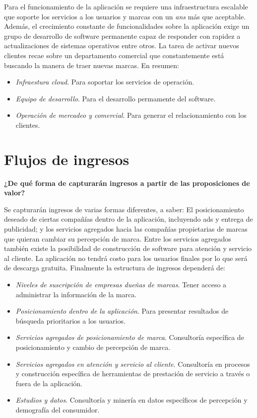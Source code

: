 Para el funcionamiento de la aplicación se requiere una infraestructura escalable que soporte los servicios a los usuarios y marcas con un \textit{ans} más que aceptable. Además, el crecimiento constante de funcionalidades sobre la aplicación exige un grupo de desarrollo de software permanente capaz de responder con rapidez a actualizaciones de sistemas operativos entre otros. La tarea de activar nuevos clientes recae sobre un departamento comercial que constantemente está buscando la manera de traer nuevas marcas. En resumen:

\begin{itemize}
    \item \textit{Infraestura cloud}. Para soportar los servicios de operación. 
    \item \textit{Equipo de desarrollo}. Para el desarrollo permamente del software.
    \item \textit{Operación de mercadeo y comercial}. Para generar el relacionamiento con los clientes.
\end{itemize}

\section{Flujos de ingresos}

\textbf{¿De qué forma de capturarán ingresos a partir de las proposiciones de valor?}

Se capturarán ingresos de varias formas diferentes, a saber: El posicionamiento deseado de ciertas compañías dentro de la aplicación, incluyendo ads y entrega de publicidad; y los servicios agregados hacia las compañías propietarias de marcas que quieran cambiar su percepción de marca. Entre los servicios agregados también existe la posibilidad de construcción de software para atención y servicio al cliente. La aplicación no tendrá costo para los usuarios finales por lo que será de descarga gratuita. Finalmente la estructura de ingresos dependerá de: 

\begin{itemize}
    \item \textit{Niveles de suscripción de empresas dueñas de marcas}. Tener acceso a administrar la información de la marca. 
    \item \textit{Posicionamiento dentro de la aplicación}. Para presentar resultados de búsqueda prioritarios a los usuarios. 
    \item \textit{Servicios agregados de posicionamiento de marca}. Consultoría específica de posicionamiento y cambio de percepción de marca.
    \item \textit{Servicios agregados en atención y servicio al cliente}. Consultoría en procesos y construcción específica de herramientas de prestación de servicio a través o fuera de la aplicación.
    \item \textit{Estudios y datos}. Consultoría y minería en datos específicos de percepción y demografía del consumidor.
\end{itemize}

